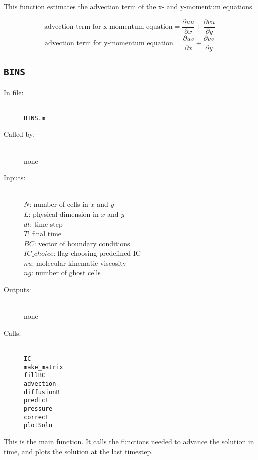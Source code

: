 \documentclass[12pt]{article}
\begin{document}
This function  estimates the advection term of the x- and y-momentum equations.

\[ \text{advection term for x-momentum equation} = \frac{\partial uu}{\partial x} + \frac{\partial vu}{\partial y} \]
\[ \text{advection term for y-momentum equation} = \frac{\partial uv}{\partial x} + \frac{\partial vv}{\partial y} \]


\subsection{\texttt{BINS}}
\begin{description}
\item[In file:] \hfill \\ \texttt{BINS.m}
\item[Called by:] \hfill \\ none
\item[Inputs:] \hfill \\ $N$: number of cells in $x$ and $y$ \\ $L$: physical dimension in $x$ and $y$ \\ $dt$: time step \\ $T$: final time \\ $BC$: vector of boundary conditions \\ $IC\_choice$: flag choosing predefined IC \\ $nu$: molecular kinematic viscosity \\ $ng$: number of ghost cells
\item[Outputs:] \hfill \\ none
\item[Calls:] \hfill \\ \texttt{IC} \\ \texttt{make\_matrix} \\ \texttt{fillBC} \\ \texttt{advection} \\ \texttt{diffusionB} \\ \texttt{predict} \\ \texttt{pressure} \\ \texttt{correct} \\ \texttt{plotSoln}
\end{description}
This is the main function.  It calls the functions needed to advance the solution in time, and plots the solution at the last timestep.
\end{document}
